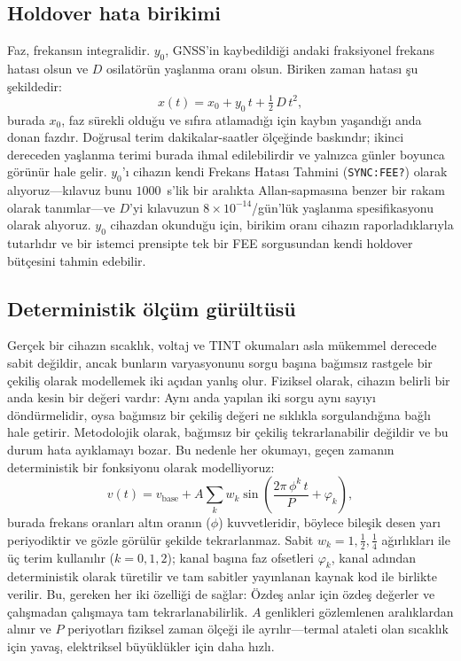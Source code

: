 \documentclass[conference]{IEEEtran}
\begin{document}
\subsection{Holdover hata birikimi}
Faz, frekansın integralidir. $y_0$, GNSS'in kaybedildiği andaki fraksiyonel frekans hatası olsun ve $D$ osilatörün yaşlanma oranı olsun. Biriken zaman hatası şu şekildedir:
\begin{equation}
x(t) = x_0 + y_0\,t + \tfrac{1}{2}\,D\,t^{2},
\label{eq:holdover}
\end{equation}
burada $x_0$, faz sürekli olduğu ve sıfıra atlamadığı için kaybın yaşandığı anda donan fazdır. Doğrusal terim dakikalar-saatler ölçeğinde baskındır; ikinci dereceden yaşlanma terimi burada ihmal edilebilirdir ve yalnızca günler boyunca görünür hale gelir. $y_0$'ı cihazın kendi Frekans Hatası Tahmini (\texttt{SYNC:FEE?}) olarak alıyoruz---kılavuz bunu $1000$~s'lik bir aralıkta Allan-sapmasına benzer bir rakam olarak tanımlar---ve $D$'yi kılavuzun $8\times10^{-14}$/gün'lük yaşlanma spesifikasyonu olarak alıyoruz. $y_0$ cihazdan okunduğu için, birikim oranı cihazın raporladıklarıyla tutarlıdır ve bir istemci prensipte tek bir FEE sorgusundan kendi holdover bütçesini tahmin edebilir.

\subsection{Deterministik ölçüm gürültüsü}
Gerçek bir cihazın sıcaklık, voltaj ve TINT okumaları asla mükemmel derecede sabit değildir, ancak bunların varyasyonunu sorgu başına bağımsız rastgele bir çekiliş olarak modellemek iki açıdan yanlış olur. Fiziksel olarak, cihazın belirli bir anda kesin bir değeri vardır: Aynı anda yapılan iki sorgu aynı sayıyı döndürmelidir, oysa bağımsız bir çekiliş değeri ne sıklıkla sorgulandığına bağlı hale getirir. Metodolojik olarak, bağımsız bir çekiliş tekrarlanabilir değildir ve bu durum hata ayıklamayı bozar. Bu nedenle her okumayı, geçen zamanın deterministik bir fonksiyonu olarak modelliyoruz:
\begin{equation}
v(t) = v_{\mathrm{base}} + A \sum_{k} w_k
       \sin\!\left(\frac{2\pi\,\phi^{k}\,t}{P} + \varphi_k\right),
\label{eq:noise}
\end{equation}
burada frekans oranları altın oranın ($\phi$) kuvvetleridir, böylece bileşik desen yarı periyodiktir ve gözle görülür şekilde tekrarlanmaz. Sabit $w_k=1,\tfrac12,\tfrac14$ ağırlıkları ile üç terim kullanılır ($k=0,1,2$); kanal başına faz ofsetleri $\varphi_k$, kanal adından deterministik olarak türetilir ve tam sabitler yayınlanan kaynak kod ile birlikte verilir. Bu, gereken her iki özelliği de sağlar: Özdeş anlar için özdeş değerler ve çalışmadan çalışmaya tam tekrarlanabilirlik. $A$ genlikleri gözlemlenen aralıklardan alınır ve $P$ periyotları fiziksel zaman ölçeği ile ayrılır---termal ataleti olan sıcaklık için yavaş, elektriksel büyüklükler için daha hızlı.
\end{document}
